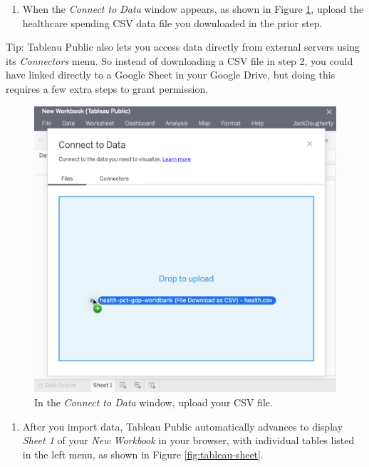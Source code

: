 \documentclass[
  english,
]{book}
\providecommand{\tightlist}{%
  \setlength{\itemsep}{0pt}\setlength{\parskip}{0pt}}
\begin{document}
\begin{enumerate}
\def\labelenumi{\arabic{enumi}.}
\setcounter{enumi}{3}
\tightlist
\item
  When the \emph{Connect to Data} window appears, as shown in Figure \ref{fig:tableau-connect-data}, upload the healthcare spending CSV data file you downloaded in the prior step.
\end{enumerate}

Tip: Tableau Public also lets you access data directly from external servers using its \emph{Connectors} menu. So instead of downloading a CSV file in step 2, you could have linked directly to a Google Sheet in your Google Drive, but doing this requires a few extra steps to grant permission.



\begin{figure}
\includegraphics[width=600px]{images/07-map/tableau-connect-data} \caption{In the \emph{Connect to Data} window, upload your CSV file.}\label{fig:tableau-connect-data}
\end{figure}

\begin{enumerate}
\def\labelenumi{\arabic{enumi}.}
\setcounter{enumi}{4}
\tightlist
\item
  After you import data, Tableau Public automatically advances to display \emph{Sheet 1} of your \emph{New Workbook} in your browser, with individual tables listed in the left menu, as shown in Figure \ref{fig:tableau-sheet}.
\end{enumerate}
\end{document}
